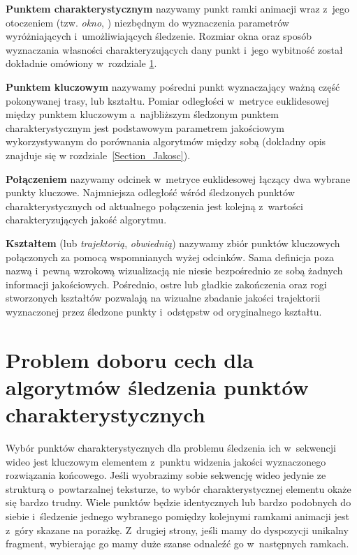     \textbf{Punktem charakterystycznym} nazywamy punkt ramki animacji wraz z~jego otoczeniem (tzw. \textit{okno}, \cite{SalientPointsTracking05}) niezbędnym do wyznaczenia parametrów wyróżniających i~umożliwiających śledzenie. Rozmiar okna oraz sposób wyznaczania własności charakteryzujących dany punkt i~jego wybitność został dokładnie omówiony w~rozdziale \ref{Section_GoodGeaturesToTrack}.

    \textbf{Punktem kluczowym} nazywamy pośredni punkt wyznaczający ważną część pokonywanej trasy, lub kształtu. Pomiar odległości w~metryce euklidesowej między punktem kluczowym a~najbliższym śledzonym punktem charakterystycznym jest podstawowym parametrem jakościowym wykorzystywanym do porównania algorytmów między sobą (dokładny opis znajduje się w rozdziale~\ref{Section_Jakosc}).

    \textbf{Połączeniem} nazywamy odcinek w~metryce euklidesowej łączący dwa wybrane punkty kluczowe. Najmniejsza odległość wśród śledzonych punktów charakterystycznych od aktualnego połączenia jest kolejną z~wartości charakteryzujących jakość algorytmu.

    \textbf{Kształtem} (lub \textit{trajektorią}, \textit{obwiednią}) nazywamy zbiór punktów kluczowych połączonych za pomocą wspomnianych wyżej odcinków. Sama definicja poza nazwą i~pewną wzrokową wizualizacją nie niesie bezpośrednio ze sobą żadnych informacji jakościowych. Pośrednio, ostre lub gładkie zakończenia oraz rogi stworzonych kształtów pozwalają na wizualne zbadanie jakości trajektorii wyznaczonej przez śledzone punkty i~odstępstw od oryginalnego kształtu.

  \section{Problem doboru cech dla algorytmów śledzenia punktów charakterystycznych}\label{Section_GoodGeaturesToTrack}
    Wybór punktów charakterystycznych dla problemu śledzenia ich w~sekwencji wideo jest kluczowym elementem z~punktu widzenia jakości wyznaczonego rozwiązania końcowego. Jeśli wyobrazimy sobie sekwencję wideo jedynie ze strukturą o~powtarzalnej teksturze, to wybór charakterystycznej elementu okaże się bardzo trudny. Wiele punktów będzie identycznych lub bardzo podobnych do siebie i~śledzenie jednego wybranego pomiędzy kolejnymi ramkami animacji jest z~góry skazane na porażkę. Z~drugiej strony, jeśli mamy do dyspozycji unikalny fragment, wybierając go mamy duże szanse odnaleźć go w~następnych ramkach.

